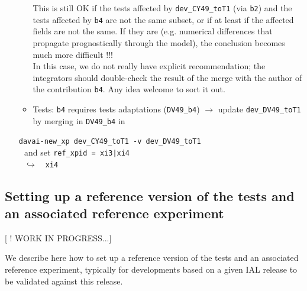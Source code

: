 \documentclass[a4paper,10pt,twoside]{article}
\begin{document}
\begin{appendix}
\begin{enumerate}[label=(\arabic*)]
\begin{itemize}
  This is still OK if the tests affected by \texttt{dev\_CY49\_toT1} (via \texttt{b2}) and the tests affected by \texttt{b4} are not the same subset, or if at least if the affected fields are not the same. If they are (e.g. numerical differences that propagate prognostically through the model), the conclusion becomes much more difficult !!!\\
  In this case, we do not really have explicit recommendation; the integrators should double-check the result of the merge with the author of the contribution \texttt{b4}. Any idea welcome to sort it out.
  \item Tests: \texttt{b4} requires tests adaptations (\texttt{DV49\_b4}) $\rightarrow$ update \texttt{dev\_DV49\_toT1} by merging in \texttt{DV49\_b4} in
 \end{itemize}
 \texttt{davai-new\_xp dev\_CY49\_toT1 -v dev\_DV49\_toT1}\\
   $~~~$and set \texttt{ref\_xpid = xi3|xi4}\\
   $~~~\hookrightarrow~~~$ \texttt{xi4}
\end{enumerate}

\subsection{Setting up a reference version of the tests and an associated reference experiment\label{sect:set_a_ref_tests_version}}

[ ! WORK IN PROGRESS...]

We describe here how to set up a reference version of the tests and an associated reference experiment, typically for developments based on a given IAL release to be validated against this release.


\end{appendix}
\end{document}
